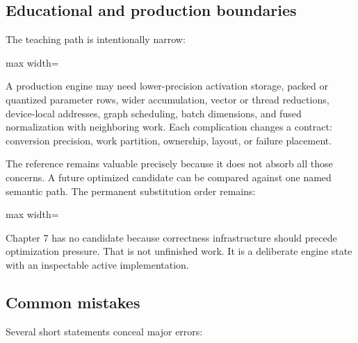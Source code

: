 \documentclass[
  10pt,
]{article}
\begin{document}
\subsection{Educational and production
boundaries}\label{educational-and-production-boundaries}

The teaching path is intentionally narrow:

\begin{center}\begin{adjustbox}{max width=\linewidth}\end{adjustbox}\end{center}

A production engine may need lower-precision activation storage, packed
or quantized parameter rows, wider accumulation, vector or thread
reductions, device-local addresses, graph scheduling, batch dimensions,
and fused normalization with neighboring work. Each complication changes
a contract: conversion precision, work partition, ownership, layout, or
failure placement.

The reference remains valuable precisely because it does not absorb all
those concerns. A future optimized candidate can be compared against one
named semantic path. The permanent substitution order remains:

\begin{center}\begin{adjustbox}{max width=\linewidth}\end{adjustbox}\end{center}

Chapter 7 has no candidate because correctness infrastructure should
precede optimization pressure. That is not unfinished work. It is a
deliberate engine state with an inspectable active implementation.

\subsection{Common mistakes}\label{common-mistakes-5}

Several short statements conceal major errors:
\end{document}
